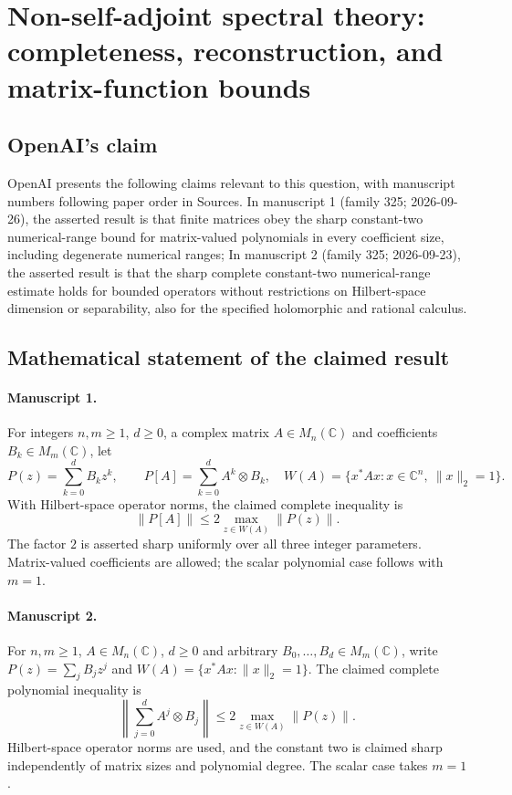 \documentclass[11pt]{article}
\begin{document}
\section*{Non-self-adjoint spectral theory: completeness, reconstruction, and matrix-function bounds}

\subsection{OpenAI's claim}
OpenAI presents the following claims relevant to this question, with manuscript numbers following paper order in Sources. In manuscript 1 (family 325; 2026-09-26), the asserted result is that finite matrices obey the sharp constant-two numerical-range bound for matrix-valued polynomials in every coefficient size, including degenerate numerical ranges; In manuscript 2 (family 325; 2026-09-23), the asserted result is that the sharp complete constant-two numerical-range estimate holds for bounded operators without restrictions on Hilbert-space dimension or separability, also for the specified holomorphic and rational calculus.

\subsection{Mathematical statement of the claimed result}
\paragraph{Manuscript 1.}
For integers $n,m\ge1$, $d\ge0$, a complex matrix $A\in M_n(\mathbb C)$ and coefficients $B_k\in M_m(\mathbb C)$, let
\[
 P(z)=\sum_{k=0}^d B_kz^k,\qquad P[A]=\sum_{k=0}^d A^k\otimes B_k,
 \quad W(A)=\{x^*Ax:x\in\mathbb C^n,\ \|x\|_2=1\}.
\]
With Hilbert-space operator norms, the claimed complete inequality is
\[
 \|P[A]\|\le2\max_{z\in W(A)}\|P(z)\|.
\]
The factor $2$ is asserted sharp uniformly over all three integer parameters. Matrix-valued coefficients are allowed; the scalar polynomial case follows with $m=1$.

\paragraph{Manuscript 2.}
For $n,m\ge1$, $A\in M_n(\mathbb C)$, $d\ge0$ and arbitrary $B_0,\ldots,B_d\in M_m(\mathbb C)$, write $P(z)=\sum_jB_jz^j$ and $W(A)=\{x^*Ax:\|x\|_2=1\}$. The claimed complete polynomial inequality is
\[
 \left\|\sum_{j=0}^dA^j\otimes B_j\right\|\le2\max_{z\in W(A)}\|P(z)\|.
\]
Hilbert-space operator norms are used, and the constant two is claimed sharp independently of matrix sizes and polynomial degree. The scalar case takes $m=1$.
\end{document}
